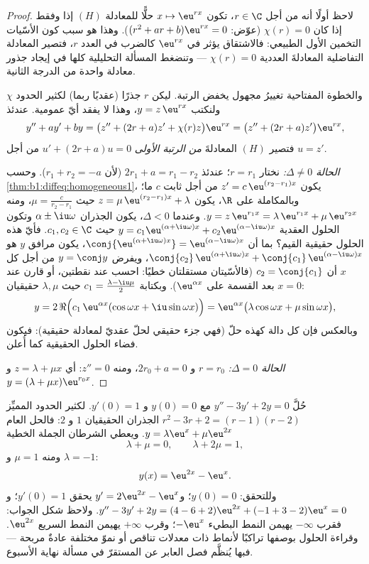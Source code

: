 \begin{proof}
لاحظ أولًا أنه من أجل $r \in \C$، تكون $x \mapsto \eu^{rx}$ حلًّا للمعادلة $(H)$
إذا وفقط إذا كان $\chi(r) = 0$ (عوّض: $(r^2 + ar + b)\eu^{rx} =
0$). وهذا هو سبب كون الأسّيات التخمين الأول الطبيعي:
فالاشتقاق يؤثر في $\eu^{rx}$ كالضرب في العدد
$r$، فتصير المعادلة التفاضلية المعادلةَ العددية
$\chi(r) = 0$ --- وتنضغط المسألة التحليلية كلها في
إيجاد جذور معادلة واحدة من الدرجة الثانية.

والخطوة المفتاحية تغييرُ مجهول يخفض الرتبة. ليكن $r$
جذرًا (عقديًا ربما) لكثير الحدود $\chi$ ولنكتب $y = z\, \eu^{rx}$،
وهذا لا يفقد أيّ عمومية. عندئذ
\[
y'' + ay' + by
= \bigl(z'' + (2r + a) z' + \chi(r) z\bigr)\eu^{rx}
= \bigl(z'' + (2r + a) z'\bigr)\eu^{rx},
\]
فتصير $(H)$ المعادلةَ \emph{من الرتبة الأولى} $u' + (2r + a) u = 0$
من أجل $u = z'$.

\emph{الحالة $\Delta \neq 0$:} نختار $r = r_1$؛ عندئذ $2r_1 + a = r_1 -
r_2$ (لأن $r_1 + r_2 = -a$). وحسب
\cref{thm:b1:diffeq:homogeneous1}، يكون $z' = c\,\eu^{(r_2 - r_1)x}$ من أجل
ثابت $c$ ما؛ وبالمكاملة على $\R$، يكون $z = \mu\, \eu^{(r_2 - r_1)x}
+ \lambda$ حيث $\mu = \frac{c}{r_2 - r_1}$، ومنه $y = z\,
\eu^{r_1 x} = \lambda\,\eu^{r_1x} + \mu\,\eu^{r_2x}$.
وعندما $\Delta < 0$، يكون الجذران $\alpha \pm \iu\omega$ وتكون
الحلول العقدية $y = c_1\eu^{(\alpha+\iu\omega)x} +
c_2\eu^{(\alpha-\iu\omega)x}$ حيث $c_1, c_2 \in \C$. فأيّ
هذه الحلول حقيقية القيم؟ بما أن $\conj{\eu^{(\alpha+\iu\omega)x}} =
\eu^{(\alpha-\iu\omega)x}$، يكون مرافق $y$ هو $\conj{c_2}\,
\eu^{(\alpha+\iu\omega)x} + \conj{c_1}\,\eu^{(\alpha-\iu\omega)x}$،
ويفرض $y = \conj y$ من أجل كل $x$ أن $c_2 = \conj{c_1}$ (فالأسّيتان
مستقلتان خطيًا: احسب عند نقطتين، أو
قارن عند $x=0$ بعد القسمة على $\eu^{\alpha x}$). وبكتابة $c_1
= \frac{\lambda - \iu\mu}2$ حيث $\lambda, \mu$ حقيقيان:
\[
y = 2\,\Re\Bigl(c_1\,\eu^{\alpha x}(\cos\omega x +
\iu\sin\omega x)\Bigr)
= \eu^{\alpha x}\bigl(\lambda\cos\omega x + \mu\sin\omega
x\bigr),
\]
وبالعكس فإن كل دالة كهذه حلّ (فهي جزء حقيقي لحلّ
عقديّ لمعادلة حقيقية): فيكون فضاء الحلول الحقيقية
كما أُعلن.

\emph{الحالة $\Delta = 0$:} $r = r_0$ و $2r_0 + a = 0$، ومنه $z'' = 0$:
أي $z = \lambda + \mu x$ و$y = (\lambda + \mu x)\eu^{r_0 x}$.
\end{proof}

\begin{example}\label{ex:b1:diffeq:cauchy2}
حُلَّ $y'' - 3y' + 2y = 0$ مع $y(0) = 0$ و $y'(0) = 1$. لكثير
الحدود المميِّز $r^2 - 3r + 2 = (r - 1)(r - 2)$ الجذران
الحقيقيان $1$ و $2$: فالحل العام $y = \lambda\eu^{x} +
\mu\eu^{2x}$. ويعطي الشرطان الجملة الخطية
\[
\lambda + \mu = 0, \qquad \lambda + 2\mu = 1 ,
\]
ومنه $\mu = 1$ و $\lambda = -1$:
\[
y(x) = \eu^{2x} - \eu^{x} .
\]
وللتحقق: $y(0) = 0$؛ و$y' = 2\eu^{2x} - \eu^x$ يحقق $y'(0) = 1$؛ و
$y'' - 3y' + 2y = (4 - 6 + 2)\eu^{2x} + (-1 + 3 - 2)\eu^x = 0$.
ولاحظ شكل الجواب: فقرب $-\infty$ يهيمن النمط البطيء
$-\eu^x$؛ وقرب $+\infty$ يهيمن النمط السريع $\eu^{2x}$.
وقراءة الحلول بوصفها تراكبًا لأنماط ذات معدلات تناقص أو
نموّ مختلفة عادةٌ مربحة --- فبها يُنظَّم
فصل العابر عن المستقرّ في مسألة نهاية الأسبوع.
\end{example}

